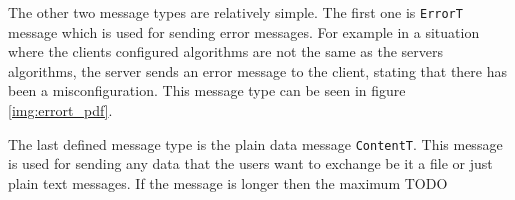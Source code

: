 The other two message types are relatively simple. The first one is \texttt{ErrorT} message which is used for sending error messages. For example in a situation where the clients configured algorithms are not the same as the servers algorithms, the server sends an error message to the client, stating that there has been a misconfiguration. This message type can be seen in figure \ref{img:errort_pdf}.

The last defined message type is the plain data message \texttt{ContentT}. This message is used for sending any data that the users want to exchange be it a file or just plain text messages. If the message is longer then the maximum TODO

